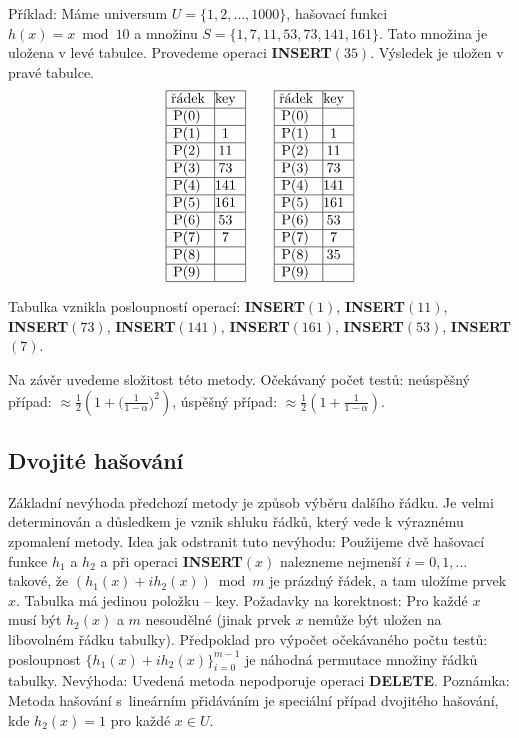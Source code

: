 \documentclass[a4paper,12pt]{article}
\begin{document}
Příklad: Máme universum $U=\{1,2,\dots,1000\}$, 
hašovací funk\-ci $h(x)=x\bmod10$ a množinu  
$S=\{1,7,11,53,73,141,161\}$. Tato množina je uložena v levé tabulce. 
Provedeme operaci {\bf INSERT$(35)$}. Výsledek je uložen v 
pravé tabulce.
$$\vbox {\hbox{\vtop{\offinterlineskip\halign{\strut\vrule\ # & \vrule\hfil# \hfil\vrule\cr\noalign{\hrule}řádek & key \hfil\cr\noalign{\hrule}P(0) & \hfill \cr\noalign{\hrule}P(1) & 1 \cr\noalign{\hrule}P(2) & 11 \cr\noalign{\hrule}P(3) & 73 \cr\noalign{\hrule}P(4) & 141 \cr\noalign{\hrule}P(5) & 161 \cr\noalign{\hrule}P(6) & 53 \cr\noalign{\hrule}P(7) & 7 \cr\noalign{\hrule}P(8) & \hfill\cr\noalign{\hrule}P(9) & \hfill \cr\noalign{\hrule}}}\qquad\vtop{\offinterlineskip\halign {\strut\vrule\ # & \vrule \hfil # \hfil \vrule\cr\noalign{\hrule}řádek & key \hfil \cr\noalign{\hrule}P(0) & \hfill \cr\noalign{\hrule}P(1) & 1 \cr\noalign{\hrule}P(2) & 11 \cr\noalign{\hrule}P(3) & 73 \cr\noalign{\hrule}P(4) & 141 \cr\noalign{\hrule}P(5) & 161 \cr\noalign{\hrule}P(6) & 53 \cr\noalign{\hrule}P(7) & 7 \cr\noalign{\hrule}P(8) & 35  \cr\noalign{\hrule}P(9) & \hfill \cr\noalign{\hrule}}}}}$$

Tabulka vznikla posloupností operací:\newline 
{\bf INSERT$(1)$}, {\bf INSERT$(11)$}, {\bf INSERT$(73)$}, 
{\bf INSERT$(141)$}, {\bf INSERT$(161)$},\newline 
{\bf INSERT$(53)$}, {\bf INSERT$(7)$}. 

Na závěr uvedeme složitost této metody. Očekávaný 
počet testů:\newline 
\phantom{---}neúspěšný případ: $\approx\frac 12(
1+\big(\frac 1{1-\alpha}\big)^2)$, \newline 
\phantom{---}úspěšný případ: $\approx\frac 12(1+\frac 
1{1-\alpha})$.

\subsection{Dvojité hašování}

Základní nevýhoda předchozí metody je způsob 
výběru dal\-ší\-ho řádku. Je velmi determinován a 
důsledkem je vznik shluku řádků, který 
vede k výraznému zpomalení metody. \newline 
Idea jak odstranit tuto nevýhodu: Použijeme dvě 
hašovací funkce $h_1$ a $h_2$ a při operaci {\bf INSERT$
(x)$ }
nalezneme nejmenší $i=0,1,\dots$ takové, že 
$(h_1(x)+ih_2(x))\bmod m$ je prázdný řádek, a tam uložíme 
prvek $x$.\newline 
Tabulka má jedinou položku -- key.\newline 
Požadavky na korektnost: Pro každé $x$ musí být $h_
2(x)$ a 
$m$ nesoudělné (jinak prvek $x$ nemůže být uložen 
na libovolném řádku tabulky). \newline 
Předpoklad pro výpočet očekávaného počtu testů: posloupnost 
$\{h_1(x)+ih_2(x)\}_{i=0}^{m-1}$ je náhodná permutace množiny 
řádků tabulky.\newline 
Nevýhoda: Uvedená metoda nepodporuje operaci {\bf DELETE}. \newline 
Poznámka: Metoda hašování s~lineárním přidáváním je 
speciál\-ní případ dvojitého hašování, kde $
h_2(x)=1$ pro 
každé $x\in U$.
\end{document}
